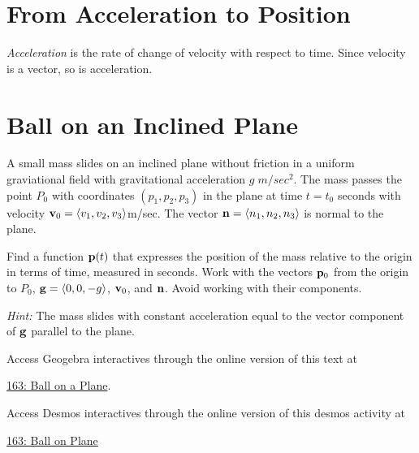 \documentclass{ximera}
\begin{document}
\section{From Acceleration to Position}
\emph{Acceleration} is the rate of change of velocity with respect to time. Since velocity is a vector, so is acceleration.


\section{Ball on an Inclined Plane}

\begin{question}  \label{Qefd46365}
A small mass slides on an inclined plane without friction in a uniform graviational field with gravitational acceleration $g \;  m/sec^2$. The mass passes the point $P_0$ with coordinates $(p_1, p_2, p_3 )$ in the plane at time $t=t_0$ seconds with velocity ${\bf v}_0 = \langle v_1, v_2, v_3 \rangle$m/sec.  The vector ${\bf n} =\langle n_1, n_2, n_3\rangle$ is normal to the plane.

Find a function ${\bf p}(t)$ that expresses the position of the mass relative to the origin in terms of time, measured in seconds. Work with the vectors ${\bf p}_0$ from the origin to $P_0$, ${\bf g} = \langle 0, 0, -g \rangle$, ${\bf v}_0$, and ${\bf n}$. Avoid working with their components.

{\it Hint:}  The mass slides with constant acceleration equal to the vector component of ${\bf g}$ parallel to the plane.




\begin{exploration}
\begin{onlineOnly}
    \begin{center}
\end{center}
\end{onlineOnly}


Access Geogebra interactives through the online version of this text at

 
\href{https://www.geogebra.org/classic/rcmapxuh}{163: Ball on a Plane}.

Access Desmos interactives through the online version of this desmos activity at

\href{https://www.desmos.com/3d/07057c1762}{163: Ball on Plane}


\end{exploration}

\end{question}
\end{document}
